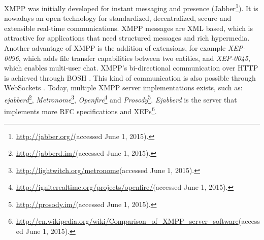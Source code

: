   \ac{XMPP} was initially developed for instant messaging and presence (Jabber\footnote{\url{http://jabber.org/}(accessed June 1, 2015).}). It is nowadays an open technology for standardized, decentralized, secure and extensible real-time communications. 
  \ac{XMPP} messages are \ac{XML} based, which is attractive for applications that need structured messages and rich hypermedia. Another advantage of \ac{XMPP} is the addition of extensions, for example \emph{XEP-0096}\cite{xep0096}, which adds file transfer capabilities between two entities, and \emph{XEP-0045}\cite{xep0045}, which enables multi-user chat.
  \ac{XMPP}'s bi-directional communication over \ac{HTTP} is achieved through \ac{BOSH} \cite{xep0206}.
  This kind of communication is also possible through WebSockets \cite{rfc7395}.
  Today, multiple \ac{XMPP} server implementations exists, such as: \emph{ejabberd}\footnote{\url{http://jabberd.im/}(accessed June 1, 2015).}, \emph{Metronome}\footnote{\url{http://lightwitch.org/metronome}(accessed June 1, 2015).}, \emph{Openfire}\footnote{\url{http://igniterealtime.org/projects/openfire/}(accessed June 1, 2015).} and \emph{Prosody}\footnote{\url{http://prosody.im/}(accessed June 1, 2015).}. \emph{Ejabberd} is the server that implements more \ac{RFC} specifications and \ac{XEP}s\footnote{\url{http://en.wikipedia.org/wiki/Comparison_of_XMPP_server_software}(accessed June 1, 2015).}.
  
